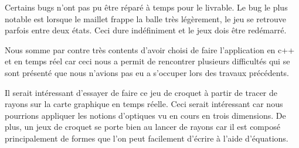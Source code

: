 \documentclass{article}
\begin{document}
Certains bugs n'ont pas pu être réparé à temps pour le livrable. Le
bug le plus notable est lorsque le maillet frappe la balle très
légèrement, le jeu se retrouve parfois entre deux états. Ceci dure
indéfiniment et le jeux dois être redémarré.

Nous somme par contre très contents d'avoir choisi de faire
l'application en c++ et en temps réel car ceci nous a permit de
rencontrer plusieurs difficultés qui se sont présenté que nous
n'avions pas eu a s'occuper lors des travaux précédents.

Il serait intéressant d'essayer de faire ce jeu de croquet à partir
de tracer de rayons sur la carte graphique en temps réelle. Ceci
serait intéressant car nous pourrions appliquer les notions
d'optiques vu en cours en trois dimensions. De plus, un jeux de
croquet se porte bien au lancer de rayons car il est composé
principalement de formes que l'on peut facilement d'écrire à l'aide
d'équations.
\end{document}
